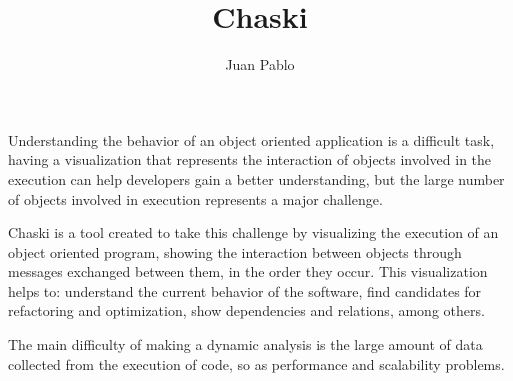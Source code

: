 \documentclass{elsart}
\begin{document}
\begin{frontmatter}



\title{Chaski}


\author{Juan Pablo}

\address{}

\begin{abstract}
\end{abstract}

\begin{keyword}

\PACS 
\end{keyword}
\end{frontmatter}

\section{}

Understanding the behavior of an object oriented application is a difficult task, having a visualization that represents the interaction of objects involved in the execution can help developers gain a better understanding, but the large number of objects involved in execution represents a major challenge.

Chaski is a tool created to take this challenge by visualizing the execution of an object oriented program, showing the interaction between objects through messages exchanged between them, in the order they occur. This visualization helps to: understand the current behavior of the software, find candidates for refactoring and optimization, show dependencies and relations, among others.

The main difficulty of making a dynamic analysis is the large amount of data collected from the execution of code, so as performance and scalability problems.
\end{document}
